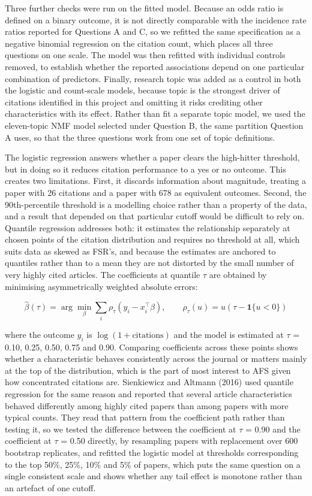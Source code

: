 \documentclass[11pt,a4paper]{article}
\begin{document}
Three further checks were run on the fitted model. Because an odds ratio is defined on a binary outcome, it is not directly comparable with the incidence rate ratios reported for Questions A and C, so we refitted the same specification as a negative binomial regression on the citation count, which places all three questions on one scale. The model was then refitted with individual controls removed, to establish whether the reported associations depend on one particular combination of predictors. Finally, research topic was added as a control in both the logistic and count-scale models, because topic is the strongest driver of citations identified in this project and omitting it risks crediting other characteristics with its effect. Rather than fit a separate topic model, we used the eleven-topic NMF model selected under Question B, the same partition Question A uses, so that the three questions work from one set of topic definitions.

The logistic regression answers whether a paper clears the high-hitter threshold, but in doing so it reduces citation performance to a yes or no outcome. This creates two limitations. First, it discards information about magnitude, treating a paper with 26 citations and a paper with 678 as equivalent outcomes. Second, the 90th-percentile threshold is a modelling choice rather than a property of the data, and a result that depended on that particular cutoff would be difficult to rely on. Quantile regression addresses both: it estimates the relationship separately at chosen points of the citation distribution and requires no threshold at all, which suits data as skewed as FSR's, and because the estimates are anchored to quantiles rather than to a mean they are not distorted by the small number of very highly cited articles. The coefficients at quantile \(\tau\) are obtained by minimising asymmetrically weighted absolute errors:

\[\hat{\beta}(\tau) = \arg\min_{\beta} \sum_i \rho_\tau\!\left(y_i - x_i^{\top}\beta\right), \qquad \rho_\tau(u) = u\left(\tau - \mathbf{1}\{u < 0\}\right)\]

where the outcome \(y_i\) is \(\log(1 + \text{citations})\) and the model is estimated at \(\tau\) = 0.10, 0.25, 0.50, 0.75 and 0.90. Comparing coefficients across these points shows whether a characteristic behaves consistently across the journal or matters mainly at the top of the distribution, which is the part of most interest to AFS given how concentrated citations are. Sienkiewicz and Altmann (2016) used quantile regression for the same reason and reported that several article characteristics behaved differently among highly cited papers than among papers with more typical counts. They read that pattern from the coefficient path rather than testing it, so we tested the difference between the coefficient at \(\tau\) = 0.90 and the coefficient at \(\tau\) = 0.50 directly, by resampling papers with replacement over 600 bootstrap replicates, and refitted the logistic model at thresholds corresponding to the top 50\%, 25\%, 10\% and 5\% of papers, which puts the same question on a single consistent scale and shows whether any tail effect is monotone rather than an artefact of one cutoff.
\end{document}
